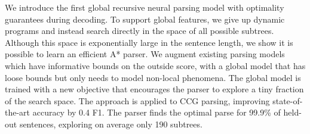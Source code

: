 We introduce the first global recursive neural parsing model with optimality guarantees during decoding. To support global features, we give up dynamic programs and instead search directly in the space of all possible subtrees. Although this space is exponentially large in the sentence length, we show it is possible to learn an efficient A* parser. We augment existing parsing models which have informative bounds on the outside score, with a global model that has loose bounds but only needs to model non-local phenomena. The global model is trained with a new objective that encourages the parser to explore a tiny fraction of the search space. The approach is applied to CCG parsing, improving state-of-the-art accuracy by 0.4 F1. The parser finds the optimal parse for 99.9\% of held-out sentences, exploring on average only 190 subtrees.
